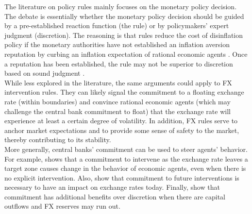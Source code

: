 \documentclass[11pt]{article}
\begin{document}
The literature on policy rules mainly focuses on the monetary policy decision.
The  debate is  essentially whether  the  monetary policy  decision should  be
guided by a  pre-established reaction function (the rule)  or by policymakers’
expert judgment (discretion).  The reasoning is that rules reduce  the cost of
disinflation  policy  if the  monetary  authorities  have not  established  an
inflation aversion reputation by curbing  an inflation expectation of rational
economic agents \citep{kydland1977}.  Once  a reputation has been established,
the  rule  may  not  be  superior   to  discretion  based  on  sound  judgment
\citep{barro1983}.\\

While less  explored in the literature,  the same arguments could  apply to FX
intervention  rules. They  can  likely  signal the  commitment  to a  floating
exchange rate (within boundaries) and convince rational economic agents (which
may challenge  the central bank  commitment to  float) that the  exchange rate
will experience at least a certain degree of volatility. In addition, FX rules
serve to anchor market expectations \citep{montoro2013} and  to provide
some sense of safety to the market, thereby contributing to its stability.\\

More  generally,  central banks’  commitment  can  be  used to  steer  agents’
behavior. For example, \cite{krugman1991} shows that a commitment to intervene
as the  exchange rate leaves  a target zone causes  change in the  behavior of
economic  agents,  even  when  there   is  no  explicit  intervention.   Also,
\cite{fanelli2020} show  that commitment to future  interventions is necessary
to have an impact on exchange rates today.  Finally, \cite{basu2018} show that
commitment  has additional  benefits over  discretion when  there are  capital
outflows and FX reserves may run out.\\
\end{document}
